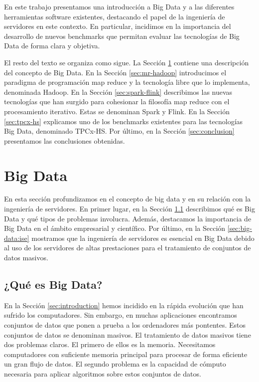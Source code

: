 \documentclass[10pt]{article}
\begin{document}
	En este trabajo presentamos una introducción a Big Data y a las diferentes herramientas software existentes, destacando el papel de la ingeniería de servidores en este contexto. En particular, incidimos en la importancia del desarrollo de nuevos benchmarks que permitan evaluar las tecnologías de Big Data de forma clara y objetiva.

	El resto del texto se organiza como sigue. La Sección \ref{sec:big-data} contiene una descripción del concepto de Big Data. En la Sección \ref{sec:mr-hadoop} introducimos el paradigma de programación map reduce y la tecnología libre que lo implementa, denominada Hadoop. En la Sección \ref{sec:spark-flink} describimos las nuevas tecnologías que han surgido para cohesionar la filosofía map reduce con el procesamiento iterativo. Estas se denominan Spark y Flink. En la Sección \ref{sec:tpcx-hs} explicamos uno de los benchmarks existentes para las tecnologías Big Data, denominado TPCx-HS. Por último, en la Sección \ref{sec:conclusion} presentamos las conclusiones obtenidas.

\section{Big Data} \label{sec:big-data}
	
	En esta sección profundizamos en el concepto de big data y en su relación con la ingeniería de servidores. En primer lugar, en la Sección \ref{sec:big-data:que-es} describimos qué es Big Data y qué tipos de problemas involucra. Además, destacamos la importancia de Big Data en el ámbito empresarial y científico. Por último, en la Sección \ref{sec:big-data:ise} mostramos que la ingeniería de servidores es esencial en Big Data debido al uso de los servidores de altas prestaciones para el tratamiento de conjuntos de datos masivos.

	\subsection{¿Qué es Big Data?} \label{sec:big-data:que-es}
	
		En la Sección \ref{sec:introduction} hemos incidido en la rápida evolución que han sufrido los computadores. Sin embargo, en muchas aplicaciones encontramos conjuntos de datos que ponen a prueba a los ordenadores más pontentes. Estos conjuntos de datos se denominan masivos. El tratamiento de datos masivos tiene dos problemas claros. El primero de ellos es la memoria. Necesitamos computadores con suficiente memoria principal para procesar de forma eficiente un gran flujo de datos. El segundo problema es la capacidad de cómputo necesaria para aplicar algoritmos sobre estos conjuntos de datos. 
		
\end{document}
